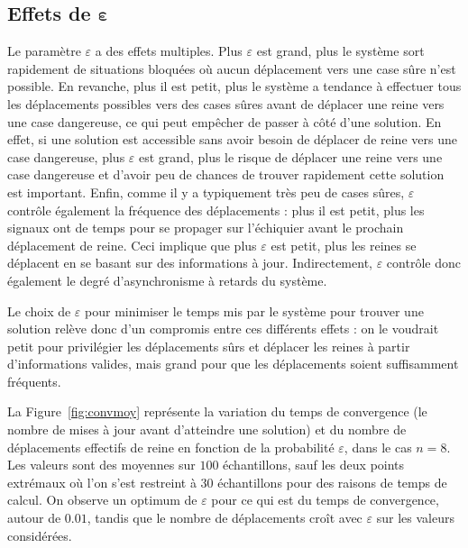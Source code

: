 \subsection{Effets de $\boldsymbol \varepsilon$}



Le paramètre $\varepsilon$ a des effets multiples. Plus $\varepsilon$ est grand, plus le système sort rapidement de situations bloquées où aucun déplacement vers une case sûre n'est possible. En revanche, plus il est petit, plus le système a tendance à effectuer tous les déplacements possibles vers des cases sûres avant de déplacer une reine vers une case dangereuse, ce qui peut empêcher de passer à côté d'une solution. En effet, si une solution est accessible sans avoir besoin de déplacer de reine vers une case dangereuse, plus $\varepsilon$ est grand, plus le risque de déplacer une reine vers une case dangereuse et d'avoir peu de chances de trouver rapidement cette solution est important. Enfin, comme il y a typiquement très peu de cases sûres, $\varepsilon$ contrôle également la fréquence des déplacements : plus il est petit, plus les signaux ont de temps pour se propager sur l'échiquier avant le prochain déplacement de reine. Ceci implique que plus $\varepsilon$ est petit, plus les reines se déplacent en se basant sur des informations à jour. Indirectement, $\varepsilon$ contrôle donc également le degré d'asynchronisme à retards du système. 

Le choix de $\varepsilon$ pour minimiser le temps mis par le système pour trouver une solution relève donc d'un compromis entre ces différents effets : on le voudrait petit pour privilégier les déplacements sûrs et déplacer les reines à partir d'informations valides, mais grand pour que les déplacements soient suffisamment fréquents.

La Figure~\ref{fig:convmoy} représente la variation du temps de convergence (le nombre de mises à jour avant d'atteindre une solution) et du nombre de déplacements effectifs de reine en fonction de la probabilité $\varepsilon$, dans le cas $n=8$. Les valeurs sont des moyennes sur $100$ échantillons, sauf les deux points extrémaux où l'on s'est restreint à $30$ échantillons pour des raisons de temps de calcul. On observe un optimum de $\varepsilon$ pour ce qui est du temps de convergence, autour de $0.01$, tandis que le nombre de déplacements croît avec $\varepsilon$ sur les valeurs considérées. 


